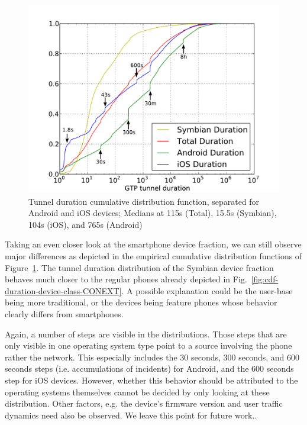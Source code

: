 
\begin{figure}
	\centering
	\includegraphics[width=\columnwidth]{images/CONEXT2012/tunnel-dur-os-cdf-mod.pdf}
	\caption{Tunnel duration cumulative distribution function, separated for Android and iOS devices; Medians at 115s (Total), 15.5s (Symbian), 104s (iOS), and 765s (Android)}
	\label{fig:cdf-duration-os-CONEXT}
\end{figure}

Taking an even closer look at the smartphone device fraction, we can still observe major differences as depicted in the empirical cumulative distribution functions of Figure~\ref{fig:cdf-duration-os-CONEXT}. The tunnel duration distribution of the Symbian device fraction behaves much closer to the regular phones already depicted in Fig.~\ref{fig:cdf-duration-device-class-CONEXT}. A possible explanation could be the user-base being more traditional, or the devices being feature phones whose behavior clearly differs from smartphones.

Again, a number of steps are visible in the distributions. %
Those steps that are only visible in one operating system type point to a source involving the phone rather the network. This especially includes the 30 seconds, 300 seconds, and 600 seconds steps (i.e. accumulations of incidents) for Android, and the 600 seconds step for iOS devices. However, whether this behavior should be attributed to the operating systems themselves cannot be decided by only looking at these distribution. Other factors, e.g. the device's firmware version and user traffic dynamics need also be observed. We leave this point for future work..

